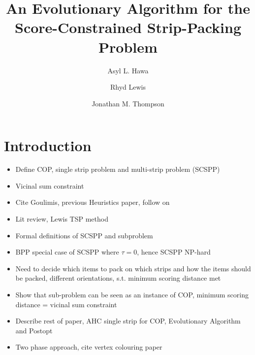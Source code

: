 \documentclass{elsarticle}
\begin{document}
	
\begin{frontmatter}
\title{An Evolutionary Algorithm for the Score-Constrained Strip-Packing Problem}
\author{Asyl L. Hawa}
\author{Rhyd Lewis}
\author{Jonathan M. Thompson}
\address{School of Mathematics, Cardiff University, Senghennydd Road, Cardiff, UK}

\end{frontmatter}


\section{Introduction}
\begin{itemize}
	\item Define COP, single strip problem and multi-strip problem (SCSPP)
	\item Vicinal sum constraint
	\item Cite Goulimis, previous Heuristics paper, follow on
	\item Lit review, Lewis TSP method
	\item Formal definitions of SCSPP and subproblem
	\item BPP special case of SCSPP where $\tau = 0$, hence SCSPP NP-hard
	\item Need to decide which items to pack on which strips and how the items should be packed, different orientations, s.t. minimum scoring distance met
	\item Show that sub-problem can be seen as an instance of COP, minimum scoring distance = vicinal sum constraint
	\item Describe rest of paper, AHC single strip for COP, Evolutionary Algorithm and Postopt
	\item Two phase approach, cite vertex colouring paper
\end{itemize}
\end{document}
